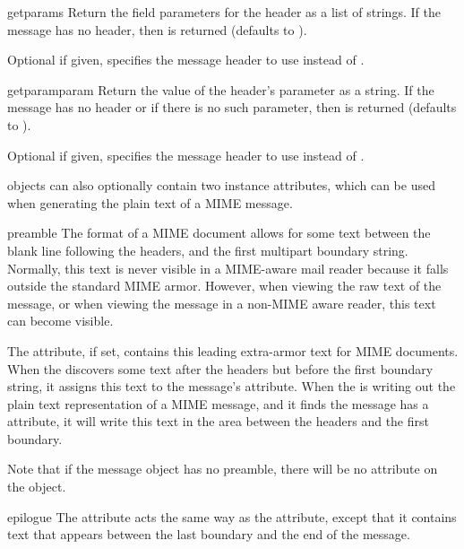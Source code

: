 \documentclass{howto}
\begin{document}
\begin{methoddesc}[Message]{getparams}{}
Return the field parameters for the  header as a
list of strings.  If the message has no  header,
then  is returned (defaults to ).

Optional  if given, specifies the message header to use
instead of .
\end{methoddesc}

\begin{methoddesc}[Message]{getparam}{param}
Return the value of the  header's parameter
 as a string.  If the message has no 
header or if there is no such parameter, then  is
returned (defaults to ).

Optional  if given, specifies the message header to use
instead of .
\end{methoddesc}

 objects can also optionally contain two instance
attributes, which can be used when generating the plain text of a MIME
message.

\begin{datadesc}{preamble}
The format of a MIME document allows for some text between the blank
line following the headers, and the first multipart boundary string.
Normally, this text is never visible in a MIME-aware mail reader
because it falls outside the standard MIME armor.  However, when
viewing the raw text of the message, or when viewing the message in a
non-MIME aware reader, this text can become visible.

The  attribute, if set, contains this leading
extra-armor text for MIME documents.  When the 
discovers some text after the headers but before the first boundary
string, it assigns this text to the message's 
attribute.  When the  is writing out the plain text
representation of a MIME message, and it finds the message has a
 attribute, it will write this text in the area between
the headers and the first boundary.

Note that if the message object has no preamble, there will be no
 attribute on the object.
\end{datadesc}

\begin{datadesc}{epilogue}
The  attribute acts the same way as the 
attribute, except that it contains text that appears between the last
boundary and the end of the message.
\end{datadesc}
\end{document}
